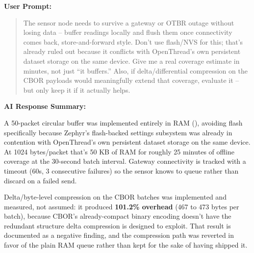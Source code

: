 \documentclass[conference]{IEEEtran}
\begin{document}
\par\vspace{4pt}\par\vspace{2pt}

\noindent\textbf{User Prompt:}\par

\begin{quote}
The sensor node needs to survive a gateway or OTBR outage without losing data -- buffer readings locally and flush them once connectivity comes back, store-and-forward style. Don't use flash/NVS for this; that's already ruled out because it conflicts with OpenThread's own persistent dataset storage on the same device. Give me a real coverage estimate in minutes, not just ``it buffers.'' Also, if delta/differential compression on the CBOR payloads would meaningfully extend that coverage, evaluate it -- but only keep it if it actually helps.
\end{quote}

\noindent\textbf{AI Response Summary:}\par

A 50-packet circular buffer was implemented entirely in RAM (\texttt{}), avoiding flash specifically because Zephyr's flash-backed settings subsystem was already in contention with OpenThread's own persistent dataset storage on the same device. At 1024 bytes/packet that's 50 KB of RAM for roughly 25 minutes of offline coverage at the 30-second batch interval. Gateway connectivity is tracked with a timeout (60s, 3 consecutive failures) so the sensor knows to queue rather than discard on a failed send.

Delta/byte-level compression on the CBOR batches was implemented and measured, not assumed: it produced \textbf{101.2\% overhead} (467 to 473 bytes per batch), because CBOR's already-compact binary encoding doesn't have the redundant structure delta compression is designed to exploit. That result is documented as a negative finding, and the compression path was reverted in favor of the plain RAM queue rather than kept for the sake of having shipped it.

\par\vspace{4pt}\par\vspace{2pt}
\end{document}
